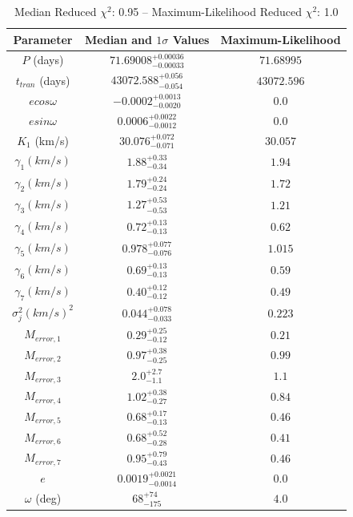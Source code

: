\documentclass{article}
\begin{document}
\begin{table}
\centering
\caption{Median Reduced $\chi^2$: 0.95 -- Maximum-Likelihood Reduced $\chi^2$: 1.0}
\begin{tabular}{| c | c | c |}
\hline
Parameter & Median and $1 \sigma$ Values & Maximum-Likelihood \\
\hline
$P$ (days) & $71.69008^{+0.00036}_{-0.00033}$ & $71.68995$ \\
\hline
$t_{tran}$ (days) & $43072.588^{+0.056}_{-0.054}$ & $43072.596$ \\
\hline
$e cos\omega$ & $-0.0002^{+0.0013}_{-0.0020}$ & $0.0$ \\
\hline
$e sin\omega$ & $0.0006^{+0.0022}_{-0.0012}$ & $0.0$ \\
\hline
$K_1$ (km/s) & $30.076^{+0.072}_{-0.071}$ & $30.057$ \\
\hline
$\gamma_{1} (km/s)$ & $1.88^{+0.33}_{-0.34}$ & $1.94$ \\
\hline
$\gamma_{2} (km/s)$ & $1.79^{+0.24}_{-0.24}$ & $1.72$ \\
\hline
$\gamma_{3} (km/s)$ & $1.27^{+0.53}_{-0.53}$ & $1.21$ \\
\hline
$\gamma_{4} (km/s)$ & $0.72^{+0.13}_{-0.13}$ & $0.62$ \\
\hline
$\gamma_{5} (km/s)$ & $0.978^{+0.077}_{-0.076}$ & $1.015$ \\
\hline
$\gamma_{6} (km/s)$ & $0.69^{+0.13}_{-0.13}$ & $0.59$ \\
\hline
$\gamma_{7} (km/s)$ & $0.40^{+0.12}_{-0.12}$ & $0.49$ \\
\hline
$\sigma^2_{j} (km/s)^2$ & $0.044^{+0.078}_{-0.033}$ & $0.223$ \\
\hline
$M_{error, 1} $ & $0.29^{+0.25}_{-0.12}$ & $0.21$ \\
\hline
$M_{error, 2} $ & $0.97^{+0.38}_{-0.25}$ & $0.99$ \\
\hline
$M_{error, 3} $ & $2.0^{+2.7}_{-1.1}$ & $1.1$ \\
\hline
$M_{error, 4} $ & $1.02^{+0.38}_{-0.27}$ & $0.84$ \\
\hline
$M_{error, 5} $ & $0.68^{+0.17}_{-0.13}$ & $0.46$ \\
\hline
$M_{error, 6} $ & $0.68^{+0.52}_{-0.28}$ & $0.41$ \\
\hline
$M_{error, 7} $ & $0.95^{+0.79}_{-0.43}$ & $0.46$ \\
\hline
$e$ & $0.0019^{+0.0021}_{-0.0014}$ & $0.0$ \\
\hline
$\omega$ (deg) & $68^{+74}_{-175}$ & $4.0$ \\
\hline
\end{tabular}
\end{table}
\end{document}
